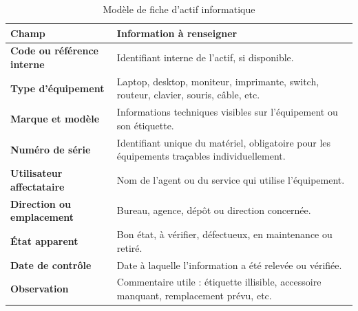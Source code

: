 \documentclass[12pt,a4paper]{report}
\begin{document}
\begin{table}[h!]
\centering
\caption{Modèle de fiche d'actif informatique}
\begin{tabularx}{\textwidth}{>{\bfseries}p{4.2cm}X}
\toprule
Champ & Information à renseigner \\
\midrule
Code ou référence interne & Identifiant interne de l'actif, si disponible. \\
Type d'équipement & Laptop, desktop, moniteur, imprimante, switch, routeur, clavier, souris, câble, etc. \\
Marque et modèle & Informations techniques visibles sur l'équipement ou son étiquette. \\
Numéro de série & Identifiant unique du matériel, obligatoire pour les équipements traçables individuellement. \\
Utilisateur affectataire & Nom de l'agent ou du service qui utilise l'équipement. \\
Direction ou emplacement & Bureau, agence, dépôt ou direction concernée. \\
État apparent & Bon état, à vérifier, défectueux, en maintenance ou retiré. \\
Date de contrôle & Date à laquelle l'information a été relevée ou vérifiée. \\
Observation & Commentaire utile : étiquette illisible, accessoire manquant, remplacement prévu, etc. \\
\bottomrule
\end{tabularx}
\end{table}
\end{document}
